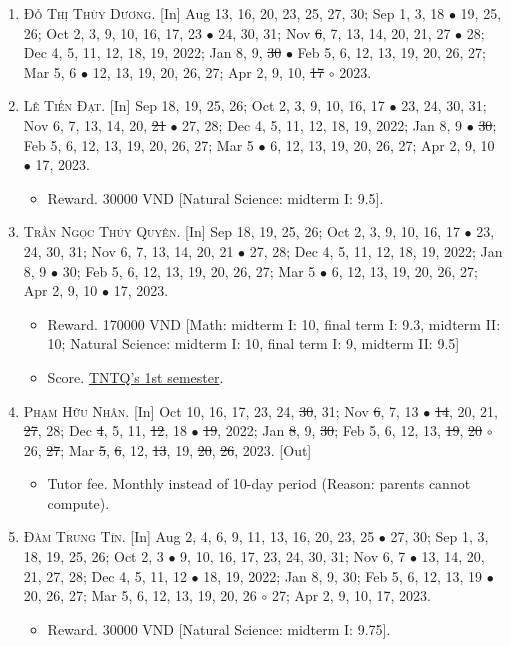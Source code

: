\documentclass{article}
\begin{document}
\begin{enumerate}
	\item \textsc{Đỗ Thị Thùy Dương.} \textsf{[In]} Aug 13, 16, 20, 23, 25, 27, 30; Sep 1, 3, 18 $\bullet$ 19, 25, 26; Oct 2, 3, 9, 10, 16, 17, 23 $\bullet$ 24, 30, 31; Nov \st{6}, 7, 13, 14, 20, 21, 27 $\bullet$ 28; Dec 4, 5, 11, 12, 18, 19, 2022; Jan 8, 9, \st{30} $\bullet$ Feb 5, 6, 12, 13, 19, 20, 26, 27; Mar 5, 6 $\bullet$ 12, 13, 19, 20, 26, 27; Apr 2, 9, 10, \st{17} $\circ$ 2023.
	\item \textsc{Lê Tiến Đạt.} \textsf{[In]} Sep 18, 19, 25, 26; Oct 2, 3, 9, 10, 16, 17 $\bullet$ 23, 24, 30, 31; Nov 6, 7, 13, 14, 20, \st{21} $\bullet$ 27, 28; Dec 4, 5, 11, 12, 18, 19, 2022; Jan 8, 9 $\bullet$ \st{30}; Feb 5, 6, 12, 13, 19, 20, 26, 27; Mar 5 $\bullet$ 6, 12, 13, 19, 20, 26, 27; Apr 2, 9, 10 $\bullet$ 17, 2023.
	\begin{itemize}
		\item \textsf{Reward.} 30000 VND [Natural Science: midterm I: 9.5].
	\end{itemize}
	\item \textsc{Trần Ngọc Thúy Quyên.} \textsf{[In]} Sep 18, 19, 25, 26; Oct 2, 3, 9, 10, 16, 17 $\bullet$ 23, 24, 30, 31; Nov 6, 7, 13, 14, 20, 21 $\bullet$ 27, 28; Dec 4, 5, 11, 12, 18, 19, 2022; Jan 8, 9 $\bullet$ 30; Feb 5, 6, 12, 13, 19, 20, 26, 27; Mar 5 $\bullet$ 6, 12, 13, 19, 20, 26, 27; Apr 2, 9, 10 $\bullet$ 17, 2023.
	\begin{itemize}
		\item \textsf{Reward.} 170000 VND [Math: midterm I: 10, final term I: 9.3, midterm II: 10; Natural Science: midterm I: 10, final term I: 9, midterm II: 9.5]
		\item \textsf{Score.} \href{https://github.com/NQBH/hobby/blob/master/STEM/student/Tran_Ngoc_Thuy_Quyen_grade_7_1st_semester.jpg}{TNTQ's 1st semester}.
	\end{itemize}
	\item \textsc{Phạm Hữu Nhân.} \textsf{[In]} Oct 10, 16, 17, 23, 24, \st{30}, 31; Nov \st{6}, 7, 13 $\bullet$ \st{14}, 20, 21, \st{27}, 28; Dec \st{4}, 5, 11, \st{12}, 18 $\bullet$ \st{19}, 2022; Jan \st{8}, 9, \st{30}; Feb 5, 6, 12, 13, \st{19}, \st{20} $\circ$ 26, \st{27}; Mar \st{5}, \st{6}, 12, \st{13}, 19, \st{20}, \st{26}, 2023. \textsf{[Out]}
	\begin{itemize}
		\item \textsf{Tutor fee.} Monthly instead of 10-day period (Reason: parents cannot compute).
	\end{itemize}
	\item \textsc{Đàm Trung Tín.} \textsf{[In]} Aug 2, 4, 6, 9, 11, 13, 16, 20, 23, 25 $\bullet$ 27, 30; Sep 1, 3, 18, 19, 25, 26; Oct 2, 3 $\bullet$ 9, 10, 16, 17, 23, 24, 30, 31; Nov 6, 7 $\bullet$ 13, 14, 20, 21, 27, 28; Dec 4, 5, 11, 12 $\bullet$ 18, 19, 2022; Jan 8, 9, 30; Feb 5, 6, 12, 13, 19 $\bullet$ 20, 26, 27; Mar 5, 6, 12, 13, 19, 20, 26 $\circ$ 27; Apr 2, 9, 10, 17, 2023.
	\begin{itemize}
		\item \textsf{Reward.} 30000 VND [Natural Science: midterm I: 9.75].
	\end{itemize}
\end{enumerate}
\end{document}
